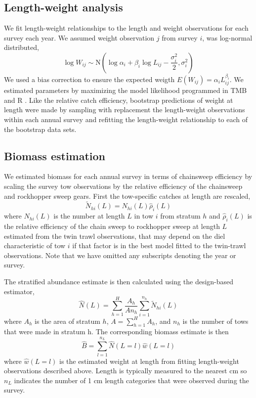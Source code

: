 \documentclass[12pt,letterpaper, leqno]{article}
\begin{document}
\subsection*{Length-weight analysis}

We fit length-weight relationships to the length and weight observations for each survey each year. We assumed weight observation $j$ from survey $i$, was log-normal distributed,
\begin{equation}\label{wal}
 \log W_{ij} \sim \text{N}\left(\log \alpha_i + \beta_i \log L_{ij} - \frac{\sigma_i^2}{2}, \sigma_i^2\right)
\end{equation}
We used a bias correction to ensure the expected weigth $E(W_{ij})= \alpha_i L_{ij}^{\beta_i}$. We estimated parameters by maximizing the model likelihood programmed in TMB \citep{kristensenetal16} and R \citep{R19}. Like the relative catch efficiency, bootstrap predictions of weight at length were made by sampling with replacement the length-weight observations within each annual survey and refitting the length-weight relationship to each of the bootstrap data sets.


\subsection*{Biomass estimation}

We estimated biomass for each annual survey in terms of chainsweep efficiency by scaling the survey tow observations by the relative efficiency of the chainsweep and rockhopper sweep gears. First the tow-specific catches at length are rescaled,
\begin{equation}\label{nal}
\widetilde N_{hi}\left(L\right) = N_{hi}\left(L\right)\widehat \rho_i\left(L\right)
\end{equation}
where $N_{hi}(L)$ is the number at length $L$ in tow $i$ from stratum $h$ and $\widehat \rho_i\left(L\right)$ is the relative efficiency of the chain sweep to rockhopper sweep at length $L$ estimated from the twin trawl observations, that may depend on the diel characteristic of tow $i$ if that factor is in the best model fitted to the twin-trawl observations. Note that we have omitted any subscripts denoting the year or survey. 

The stratified abundance estimate is then calculated using the design-based estimator, 
\begin{equation}\label{Nal_estimate}
 \widehat N(L) = \sum^H_{h=1} \frac{A_h}{An_h}\sum^{n_h}_{i=1} \widetilde N_{hi}(L)
\end{equation}
where $A_h$ is the area of stratum $h$, $A=\sum^H_{h=1} A_h$, and $n_h$ is the number of tows that were made in stratum h. The corresponding biomass estimate is then
\begin{equation}\label{biomass_estimate}
 \widehat B = \sum^{n_L}_{l=1} \widehat N(L = l) \widehat w(L=l)
\end{equation}
where $\widehat w(L=l)$ is the estimated weight at length from fitting length-weight observations described above. Length is typically measured to the nearest cm so $n_L$ indicates the number of 1 cm length categories that were observed during the survey. 
\end{document}
